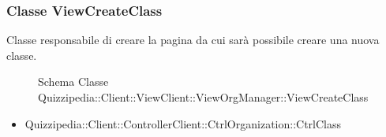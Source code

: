 \subsubsection{Classe ViewCreateClass}
Classe responsabile di creare la pagina da cui sarà possibile creare una nuova classe.
\begin{figure}[H]
\centering
\noindent{}
\caption{Schema Classe Quizzipedia::Client::ViewClient::ViewOrgManager::ViewCreateClass}
\end{figure}
\begin{itemize}
\item Quizzipedia::Client::ControllerClient::CtrlOrganization::CtrlClass
\end{itemize}
